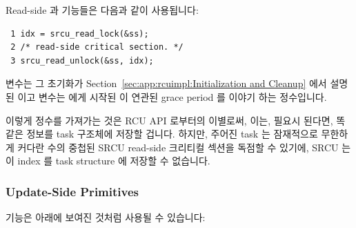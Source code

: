 Read-side  과  기능들은 다음과 같이
사용됩니다:

\vspace{5pt}
\begin{minipage}[t]{\columnwidth}
\scriptsize
\begin{verbatim}
 1 idx = srcu_read_lock(&ss);
 2 /* read-side critical section. */
 3 srcu_read_unlock(&ss, idx);
\end{verbatim}
\end{minipage}
\vspace{5pt}

 변수는
그 초기화가 Section~\ref{sec:app:rcuimpl:Initialization and Cleanup} 에서 설명된
  이고
 변수는  에게 시작된  이
연관된 grace period 를 이야기 하는 정수입니다.

이렇게 정수를 가져가는 것은 RCU API 로부터의 이별로써, 이는, 필요시 된다면,
똑같은 정보를 task 구조체에 저장할 겁니다.
하지만, 주어진 task 는 잠재적으로 무한하게 커다란 수의 중첩된 SRCU read-side
크리티컬 섹션을 독점할 수 있기에, SRCU 는 이 index 를 task structure 에 저장할
수 없습니다.

\subsubsection{Update-Side Primitives}
\label{sec:app:rcuimpl:Update-Side Primitives}

 기능은 아래에 보여진 것처럼 사용될 수 있습니다:

